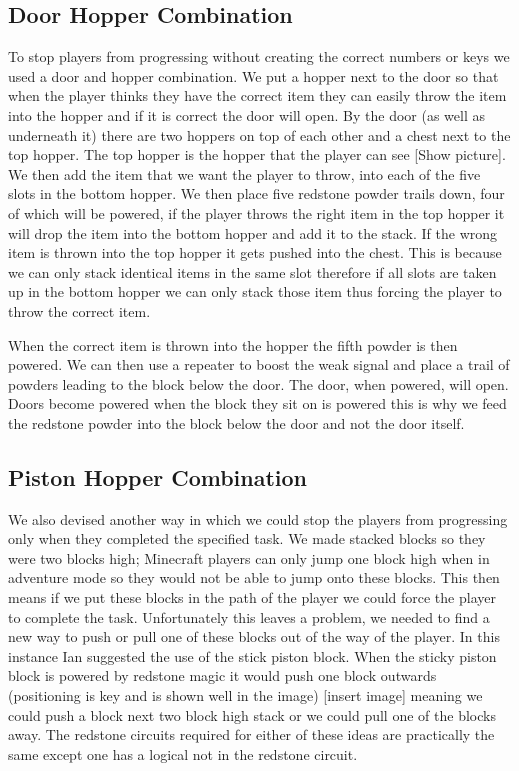 \subsection{Door Hopper Combination}
To stop players from progressing without creating the correct numbers or keys we used a door and hopper combination. We put a hopper next to the door so that when the player thinks they have the correct item they can easily throw the item into the hopper and if it is correct the door will open. By the door (as well as underneath it) there are two hoppers on top of each other and a chest next to the top hopper. The top hopper is the hopper that the player can see [Show picture]. We then add the item that we want the player to throw, into each of the five slots in the bottom hopper. We then place five redstone powder trails down, four of which will be powered, if the player throws the right item in the top hopper it will drop the item into the bottom hopper and add it to the stack. If the wrong item is thrown into the top hopper it gets pushed into the chest. This is because we can only stack identical items in the same slot therefore if all slots are taken up in the bottom hopper we can only stack those item thus forcing the player to throw the correct item.

When the correct item is thrown into the hopper the fifth powder is then powered. We can then use a repeater to boost the weak signal and place a trail of powders leading to the block below the door. The door, when powered, will open. Doors become powered when the block they sit on is powered this is why we feed the redstone powder into the block below the door and not the door itself.

\subsection{Piston Hopper Combination}
We also devised another way in which we could stop the players from progressing only when they completed the specified task. We made stacked blocks so they were two blocks high; Minecraft players can only jump one block high when in adventure mode so they would not be able to jump onto these blocks. This then means if we put these blocks in the path of the player we could force the player to complete the task. Unfortunately this leaves a problem, we needed to find a new way to push or pull one of these blocks out of the way of the player. In this instance Ian suggested the use of the stick piston block. When the sticky piston block is powered by redstone magic it would push one block outwards (positioning is key and is shown well in the image) [insert image] meaning we could push a block next two block high stack or we could pull one of the blocks away. The redstone circuits required for either of these ideas are practically the same except one has a logical not in the redstone circuit.

